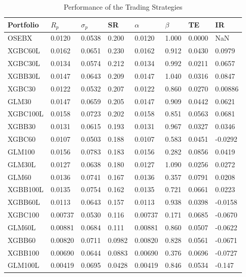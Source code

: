 \begin{table}[H]
\centering
\begin{tabularx}{\textwidth}{Xlllllll}
\toprule
Portfolio    & $R_p$   & $\sigma_p$ & SR    & $\alpha$ & $\beta$ & TE     & IR \\
\midrule
OSEBX    & 0.0120  & 0.0538     & 0.200 & 0.0120   & 1.000   & 0.0000 & NaN \\
\midrule
XGBC60L  & \cellcolor{lightlightgreen} 0.0162  & 0.0651     & \cellcolor{lightlightgreen} 0.230 & \cellcolor{lightlightgreen} 0.0162   & 0.912   & 0.0430 & \cellcolor{lightlightgreen} 0.0979 \\
XGBC30L  & 0.0134  & 0.0574     & 0.212 & 0.0134   & 0.992   & 0.0211 & 0.0657 \\
XGBB30L  & 0.0147  & 0.0643     & 0.209 & 0.0147   & 1.040   & \cellcolor{lightlightgreen} 0.0316 & 0.0847 \\
XGBC30   & 0.0122  & 0.0532     & 0.207 & 0.0122   & 0.860   & 0.0270 & 0.00886 \\
GLM30    & 0.0147  & 0.0659     & 0.205 & 0.0147   & 0.909   & 0.0442 & 0.0621 \\
XGBC100L & 0.0158  & 0.0723     & 0.202 & 0.0158   & 0.851   & 0.0563 & 0.0681 \\
XGBB30   & 0.0131  & 0.0615     & 0.193 & 0.0131   & 0.967   & 0.0327 & 0.0346 \\
XGBC60   & 0.0107  & \cellcolor{lightlightgreen} 0.0503     & 0.188 & 0.0107   & 0.583   & 0.0451 & -0.0292 \\
GLM100   & 0.0156  & 0.0783     & 0.183 & 0.0156   & 0.282   & 0.0856 & 0.0419 \\
GLM30L   & 0.0127  & 0.0638     & 0.180 & 0.0127   & \cellcolor{lightlightgreen} 1.090   & 0.0256 & 0.0272 \\
GLM60    & 0.0136  & 0.0741     & 0.167 & 0.0136   & 0.357   & 0.0791 & 0.0208 \\
XGBB100L & 0.0135  & 0.0754     & 0.162 & 0.0135   & 0.721   & 0.0661 & 0.0223 \\
XGBB60L  & 0.0113  & 0.0643     & 0.157 & 0.0113   & 0.938   & 0.0398 & -0.0158 \\
XGBC100  & 0.00737 & 0.0530     & 0.116 & 0.00737  & \cellcolor{lightlightgreen} 0.171   & 0.0685 & -0.0670 \\
GLM60L   & 0.00881 & 0.0684     & 0.111 & 0.00881  & 0.860   & 0.0507 & -0.0622 \\
XGBB60   & 0.00820 & 0.0711     & 0.0982 & 0.00820 & 0.828   & 0.0561 & -0.0671 \\
XGBB100  & 0.00690 & 0.0644     & 0.0883 & 0.00690 & 0.376   & 0.0696 & -0.0727 \\
GLM100L  & 0.00419 & 0.0695     & 0.0428 & 0.00419 & 0.846   & 0.0534 & -0.147 \\
\bottomrule
\end{tabularx}
\vspace{1em}
\caption{Performance of the Trading Strategies}
\label{tab:new-performance-trading-return-sigma-sharpe-alpha-beta-te-ir}
\end{table}



